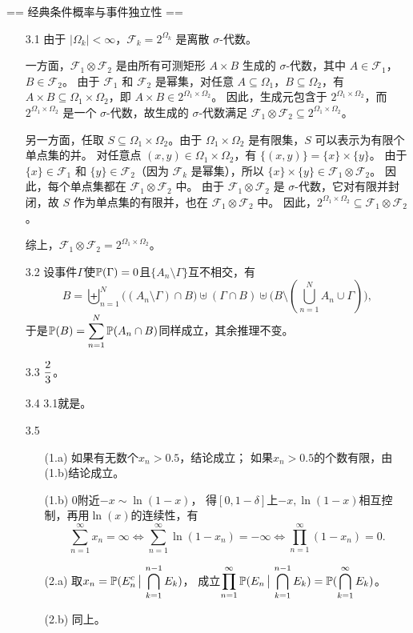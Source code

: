 == 经典条件概率与事件独立性 ==
\begin{itemize}
    \item[3.1]
    由于 $|\Omega_k| < \infty$，$\mathcal{F}_k = 2^{\Omega_k}$ 是离散 $\sigma$-代数。

    一方面，$\mathcal{F}_1 \otimes \mathcal{F}_2$ 是由所有可测矩形 $A \times B$ 生成的 $\sigma$-代数，其中 $A \in \mathcal{F}_1$，$B \in \mathcal{F}_2$。  
    由于 $\mathcal{F}_1$ 和 $\mathcal{F}_2$ 是幂集，对任意 $A \subseteq \Omega_1$，$B \subseteq \Omega_2$，有 $A \times B \subseteq \Omega_1 \times \Omega_2$，即 $A \times B \in 2^{\Omega_1 \times \Omega_2}$。  
    因此，生成元包含于 $2^{\Omega_1 \times \Omega_2}$，而 $2^{\Omega_1 \times \Omega_2}$ 是一个 $\sigma$-代数，故生成的 $\sigma$-代数满足 $\mathcal{F}_1 \otimes \mathcal{F}_2 \subseteq 2^{\Omega_1 \times \Omega_2}$。

    另一方面，任取 $S \subseteq \Omega_1 \times \Omega_2$。由于 $\Omega_1 \times \Omega_2$ 是有限集，$S$ 可以表示为有限个单点集的并。  
    对任意点 $(x,y) \in \Omega_1 \times \Omega_2$，有 $\{(x,y)\} = \{x\} \times \{y\}$。  
    由于 $\{x\} \in \mathcal{F}_1$ 和 $\{y\} \in \mathcal{F}_2$（因为 $\mathcal{F}_k$ 是幂集），所以 $\{x\} \times \{y\} \in \mathcal{F}_1 \otimes \mathcal{F}_2$。  
    因此，每个单点集都在 $\mathcal{F}_1 \otimes \mathcal{F}_2$ 中。  
    由于 $\mathcal{F}_1 \otimes \mathcal{F}_2$ 是 $\sigma$-代数，它对有限并封闭，故 $S$ 作为单点集的有限并，也在 $\mathcal{F}_1 \otimes \mathcal{F}_2$ 中。  
    因此，$2^{\Omega_1 \times \Omega_2} \subseteq \mathcal{F}_1 \otimes \mathcal{F}_2$。

    综上，$\mathcal{F}_1 \otimes \mathcal{F}_2 = 2^{\Omega_1 \times \Omega_2}$。

    \item[3.2]
    设事件$\Gamma$使$\mathbb{P}(\Gamma)=0$且$\{A_n\setminus\Gamma\}$互不相交，有
    $$B=\biguplus_{n=1}^N\big((A_n\setminus\Gamma)\cap B\big)
    \uplus(\Gamma\cap B)\uplus\big(B\setminus(\bigcup_{n=1}^NA_n\cup\Gamma)\big),$$
    于是$\displaystyle \mathbb{P}(B)=\sum_{n=1}^N\mathbb{P}(A_n\cap B)$同样成立，其余推理不变。

    \item[3.3]$\displaystyle \frac{2}{3}$。

    \item[3.4]
    3.1就是。

    \item[3.5]
    \begin{itemize}
        \item[(1.a)]如果有无数个$x_n>0.5$，结论成立；
        如果$x_n>0.5$的个数有限，由(1.b)结论成立。
        \item[(1.b)]$0$附近$-x\sim\ln(1-x)$，
        得$[0,1-\delta]$上$-x,\ln(1-x)$相互控制，再用$\ln(x)$的连续性，有
        $$\sum_{n=1}^\infty x_n=\infty
        \Leftrightarrow\sum_{n=1}^\infty\ln(1-x_n)=-\infty
        \Leftrightarrow\prod_{n=1}^\infty(1-x_n)=0.$$
        \item[(2.a)]取$\displaystyle x_n=\mathbb{P}(E_n^c\,\big|\,\bigcap\limits_{k=1}^{n-1}E_k)$，
        成立$\displaystyle \prod_{n=1}^\infty\mathbb{P}(E_n\,\big|\,\bigcap\limits_{k=1}^{n-1}E_k)
        =\mathbb{P}(\bigcap\limits_{k=1}^\infty E_k)$。
        \item[(2.b)]同上。
    \end{itemize}


\end{itemize}
